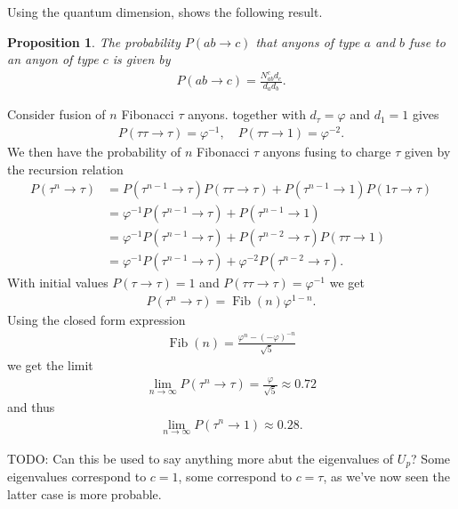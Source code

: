 \documentclass[a4paper,10pt,oneside]{book}
\theoremstyle{plain}
\newtheorem{proposition}[theorem]{Proposition}
\theoremstyle{definition}
\theoremstyle{remark}
\DeclareMathOperator{\Fib}{Fib}
\begin{document}
Using the quantum dimension, \cite{preskill} shows the following result.
\begin{proposition}\label{fusion probability}
  The probability $P(ab \to c)$ that anyons of type $a$ and $b$ fuse to an anyon of type $c$ is given by
  \begin{align*}
    P(ab \to c) = \frac{N_{ab}^c d_c}{d_a d_b}.
  \end{align*}
\end{proposition}

Consider fusion of $n$ Fibonacci $τ$ anyons.  together with $d_τ = \varphi$ and $d_1 = 1$ gives
\begin{align*}
  P(ττ \to τ) = \varphi^{-1}, \quad P(ττ \to 1) = \varphi^{-2}.
\end{align*}
We then have the probability of $n$ Fibonacci $τ$ anyons fusing to charge $τ$ given by the recursion relation
\begin{align*}
  P(τ^n \to τ)
  &= P(τ^{n-1} \to τ) P(τ τ \to τ) + P(τ^{n-1} \to 1) P(1τ \to τ) \\
  &= \varphi^{-1} P(τ^{n-1} \to τ) + P(τ^{n-1} \to 1) \\
  &= \varphi^{-1} P(τ^{n-1} \to τ) + P(τ^{n-2} \to τ) P(ττ \to 1) \\
  &= \varphi^{-1} P(τ^{n-1} \to τ) + \varphi^{-2} P(τ^{n-2} \to τ).
\end{align*}
With initial values $P(τ \to τ) = 1$ and $P(ττ \to τ) = \varphi^{-1}$ we get
\begin{align*}
  P(τ^n \to τ) = \Fib(n) \varphi^{1-n}.
\end{align*}
Using the closed form expression
\begin{align*}
  \Fib(n) = \frac{\varphi^n-(-\varphi)^{-n}}{\sqrt{5}}
\end{align*}
we get the limit
\begin{align*}
  \lim_{n\to\infty} P(τ^n \to τ) = \frac{\varphi}{\sqrt{5}} \approx 0.72
\end{align*}
and thus
\begin{align*}
  \lim_{n\to\infty} P(τ^n \to 1) \approx 0.28.
\end{align*}



TODO: Can this be used to say anything more abut the eigenvalues of $U_p$? Some eigenvalues correspond to $c=1$, some correspond to $c=τ$, as we've now seen the latter case is more probable.
\end{document}
